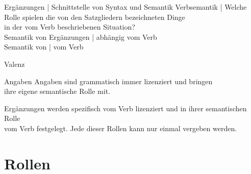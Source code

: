 \begin{frame}
  {Ergänzungen | Schnittstelle von Syntax und Semantik}
  \onslide<+->
  \onslide<+->
  Verbsemantik | Welche \alert{Rolle} spielen die von den Satzgliedern bezeichneten Dinge\\
  in der vom Verb beschriebenen Situation?\\
  \Zeile
  \onslide<+->
  Semantik von \alert{Ergänzungen} | \alert{abhängig} vom Verb\\
  \onslide<+->
  \Viertelzeile
  Semantik von  |  vom Verb\\
  \Halbzeile
  \pause
  \begin{exe}
    \ex\label{ex:valenz071}
    \begin{xlist}
      \pause
      \pause
    \end{xlist}
  \end{exe}
\end{frame}

\begin{frame}
  {Valenz}
  \onslide<+->
  \onslide<+->
  \begin{block}{Angaben}
    \alert{Angaben} sind grammatisch immer lizenziert und bringen\\
    ihre eigene semantische Rolle mit.\\
    \Halbzeile
  \end{block}
  \Zeile
  \onslide<+->
  \begin{block}{Ergänzungen}
     werden spezifisch vom Verb lizenziert und in ihrer semantischen Rolle\\
    vom Verb festgelegt. Jede dieser Rollen kann nur einmal vergeben werden.
  \end{block}
\end{frame}


\section{Rollen}

